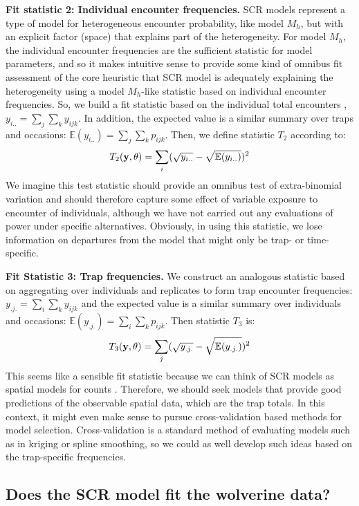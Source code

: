 {\bf Fit statistic 2: Individual encounter frequencies. } SCR models
represent a type of model for heterogeneous encounter probability, like model $M_h$, but with an explicit
factor (space) that explains part of the heterogeneity. For model $M_h$, the
individual encounter frequencies are the sufficient statistic for
model parameters, and so it makes intuitive sense to provide some kind
of omnibus fit assessment of the core heuristic that SCR model is
adequately explaining the heterogeneity using a model $M_h$-like
statistic based on individual encounter frequencies.  So, we build a
fit statistic based on the individual total encounters
\citep{russell_etal:2012}, $y_{i..} = \sum_{j} \sum_{k} y_{ijk}$. In
addition, the expected value is a similar summary over traps and
occasions: $\mathbb{E}(y_{i..}) = \sum_{j} \sum_{k}
p_{ijk}$. Then, we define statistic $T_{2}$ according to:
\[
 T_{2}({\bf y}, \theta) = \sum_{i} (\sqrt{ y_{i..} } - \sqrt{ \mathbb{E}(y_{i..}) })^2
\]
We imagine this test statistic should provide an omnibus test of
extra-binomial variation and should therefore capture some effect of
variable exposure to encounter of individuals, although we have not
carried out any evaluations of power under specific alternatives.
Obviously, in using this statistic, we lose information on departures
from the model that might only be trap- or time-specific.


{\bf Fit Statistic 3: Trap frequencies. } We construct an analogous
statistic based on aggregating over individuals and replicates to form
trap encounter frequencies: $y_{.j.} = \sum_{i} \sum_{k} y_{ijk}$
\citep{gopalaswamy_etal:2012ecol} and the expected value is a similar
summary over individuals and occasions: $\mathbb{E}(y_{.j.}) = \sum_{i}
\sum_{k} p_{ijk}$.  Then statistic $T_{3}$ is:
\[
 T_{3}({\bf y}, \theta) = \sum_{j} (\sqrt{ y_{.j.} } - \sqrt{ \mathbb{E}(y_{.j.}) })^2
\]
This seems like a sensible fit statistic because we can think of SCR
models as 
spatial models for counts
\citep{chandler_royle:2012}. Therefore, we should seek models that
provide good predictions of the observable spatial data, which are the
trap totals.  In this context, it might even make sense to pursue
cross-validation based methods for model selection.  Cross-validation 
is a standard method of evaluating models such as in kriging or spline
smoothing, so we could as well develop such ideas based on the
trap-specific frequencies.

\subsection{Does the SCR model fit the wolverine data?}

